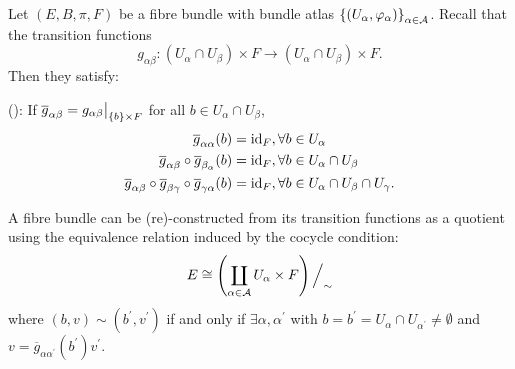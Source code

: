 \documentclass[main.tex]{subfiles}
\begin{document}
Let $(E, B,\pi, F)$ be a fibre bundle with bundle atlas $\left\{ \left(  U_\alpha, \varphi_\alpha  \right) \right\}_{\alpha \in \mathcal{A}}$. Recall that the transition functions 
\[
g_{\alpha\beta} : (U_\alpha \cap U_\beta ) \times F \longrightarrow (U_\alpha \cap U_\beta) \times F.
\]
Then they satisfy:
\begin{lemma}
(): If $\overline{g}_{\alpha\beta} = g_{\alpha\beta}\big|_{\left\{b\right\}\times F}$ for all $b \in U_\alpha \cap U_\beta$,
\begin{align*}
    \overline{g}_{\alpha\alpha}(b) &= \text{id}_{F}, \forall b \in U_\alpha \\
    \overline{g}_{\alpha\beta} \circ \overline{g}_{\beta_\alpha}(b) &= \text{id}_{F} , \forall b \in U_\alpha \cap U_\beta \\
    \overline{g}_{\alpha\beta} \circ \overline{g}_{\beta\gamma} \circ \overline{g}_{\gamma \alpha}(b) &= \text{id}_{F} , \forall b \in U_\alpha \cap U_\beta \cap U_\gamma.
\end{align*}
\end{lemma}

\begin{rmk}
A fibre bundle can be (re)-constructed from its transition functions as a quotient using the equivalence relation induced by the cocycle condition:
\[
E \cong \left( \coprod_{\alpha \in \mathcal{A}} U_\alpha \times F \right)\Big/_\sim
\] where $(b,v) \sim (b^\prime, v^\prime)$ if and only if $\exists \alpha, \alpha^\prime$ with $b= b^\prime = U_\alpha \cap U_{\alpha^\prime} \neq \emptyset$ and $v = \overline{g}_{\alpha\alpha^\prime }(b^\prime)v^\prime$.
\end{rmk}
\end{document}
